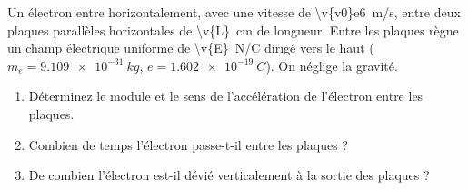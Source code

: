 Un électron entre horizontalement, avec une vitesse de \qty{\v{v0}e6}{m/s}, entre deux plaques parallèles horizontales de \qty{\v{L}}{cm} de longueur. Entre les plaques règne un champ électrique uniforme de \qty{\v{E}}{N/C} dirigé vers le haut ($m_e = \qty{9.109e-31}{kg}$, $e = \qty{1.602e-19}{C}$). On néglige la gravité.

\begin{enumerate}[label=\alph*)]
    \item Déterminez le module et le sens de l'accélération de l'électron entre les plaques.
    \item Combien de temps l'électron passe-t-il entre les plaques ?
    \item De combien l'électron est-il dévié verticalement à la sortie des plaques ?
\end{enumerate}

